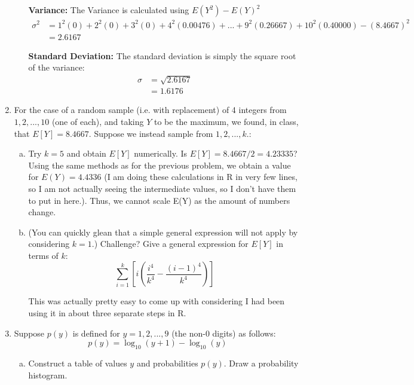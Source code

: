 \documentclass{scrartcl}
\begin{document}
\begin{enumerate}
\begin{enumerate}[a)]
      \textbf{Variance:} The Variance is calculated using $E(Y^2) - E(Y)^2$\\
      \begin{align*}
        \sigma^2 &= 1^2(0) + 2^2(0) + 3^2(0) + 4^2(0.00476) + ... + 9^2(0.26667) + 10^2(0.40000) - (8.4667)^2\\
                 &= 2.6167
      \end{align*}

      \textbf{Standard Deviation:} The standard deviation is simply the square root of the variance:\\
      \begin{align*}
        \sigma &= \sqrt{2.6167}\\
               &= 1.6176
      \end{align*}
      
  \end{enumerate}

\item For the case of a random sample (i.e. with replacement) of 4 integers from $1, 2, ..., 10$ (one of each), and taking $Y$ to be the maximum, we found, in class, that $E[Y] = 8.4667$. Suppose we instead sample from $1, 2, ..., k$.:\\
  
  \begin{enumerate}[a)]
  \item Try $k = 5$ and obtain $E[Y]$ numerically. Is $E[Y] = 8.4667/2 = 4.23335$?\\

    Using the same methods as for the previous problem, we obtain a value for $E(Y)=4.4336$ (I am doing these calculations in R in very few lines, so I am not actually seeing the intermediate values, so I don't have them to put in here.). Thus, we cannot scale E(Y) as the amount of numbers change.
    
  \item (You can quickly glean that a simple general expression will not apply by considering $k = 1$.) Challenge? Give a general expression for $E[Y]$ in terms of $k$:\\

    $$\sum_{i=1}^k\left[i\left(\frac{i^4}{k^4} - \frac{(i-1)^4}{k^4}\right)\right]$$

    This was actually pretty easy to come up with considering I had been using it in about three separate steps in R.
  \end{enumerate}
  
\item Suppose $p(y)$ is defined for $y = 1, 2, ..., 9$ (the non-0 digits) as follows: $$p(y) = \log_{10}(y+1) - \log_{10}(y)$$
  \begin{enumerate}[a)]
  \item Construct a table of values $y$ and probabilities $p(y)$. Draw a probability histogram.\\


\end{enumerate}
\end{enumerate}
\end{document}
